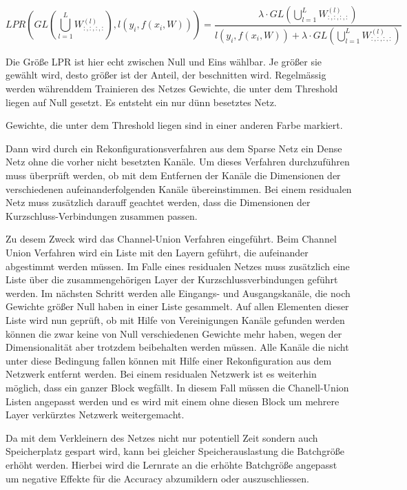\begin{equation}
 LPR(GL(\bigcup_{l=1}^{L} W_{:,:,:,:}^{(l)}),l(y_i,f(x_i,W))) = \frac{\lambda \cdot GL(\bigcup_{l=1}^{L} W_{:,:,:,:}^{(l)})}{l(y_i,f(x_i,W)) + \lambda \cdot GL(\bigcup_{l=1}^{L} W_{:,:,:,:}^{(l)})}           
\end{equation}

Die Größe LPR ist hier echt zwischen Null und Eins wählbar. Je größer sie gewählt wird, desto größer ist der Anteil, der beschnitten wird. Regelmässig werden währenddem Trainieren des Netzes Gewichte, die unter dem Threshold liegen auf Null gesetzt. Es entsteht ein nur dünn besetztes Netz. 



 Gewichte, die unter dem Threshold liegen sind in einer anderen Farbe markiert.
 

 Dann wird durch ein Rekonfigurationsverfahren aus dem Sparse Netz ein Dense Netz ohne die vorher nicht besetzten Kanäle. Um dieses Verfahren durchzuführen muss überprüft werden, ob mit dem Entfernen der Kanäle die Dimensionen der verschiedenen aufeinanderfolgenden Kanäle übereinstimmen. Bei einem residualen Netz muss zusätzlich darauff geachtet werden, dass die Dimensionen der Kurzschluss-Verbindungen zusammen passen.


Zu desem Zweck wird das Channel-Union Verfahren eingeführt. Beim Channel Union Verfahren wird ein Liste mit den Layern geführt, die aufeinander abgestimmt werden müssen. Im Falle eines residualen Netzes muss zusätzlich eine Liste über die zusammengehörigen Layer der Kurzschlussverbindungen geführt werden. Im nächsten Schritt werden alle Eingangs- und Ausgangskanäle, die noch Gewichte größer Null haben in einer Liste gesammelt. Auf allen Elementen dieser Liste wird nun geprüft, ob mit Hilfe von Vereinigungen Kanäle gefunden werden können die zwar keine von Null verschiedenen Gewichte mehr haben, wegen der Dimensionalität aber trotzdem beibehalten werden müssen. Alle Kanäle die nicht unter diese Bedingung fallen können mit Hilfe einer Rekonfiguration aus dem Netzwerk entfernt werden. 
Bei einem residualen Netzwerk ist es weiterhin möglich, dass ein ganzer Block wegfällt. In diesem Fall müssen die Chanell-Union Listen angepasst werden und es wird mit einem ohne diesen Block um mehrere Layer verkürztes Netzwerk weitergemacht.


Da mit dem Verkleinern des Netzes nicht nur potentiell Zeit sondern auch Speicherplatz gespart wird, kann bei gleicher Speicherauslastung die Batchgröße erhöht werden. Hierbei wird die Lernrate an die erhöhte Batchgröße angepasst um negative Effekte für die Accuracy abzumildern oder auszuschliessen. 

